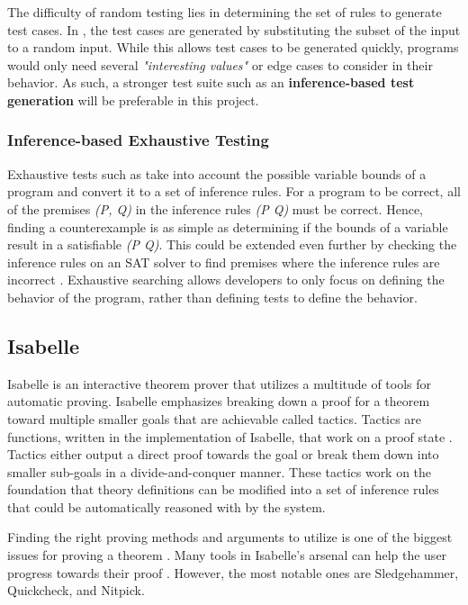 The difficulty of random testing lies in determining the set of rules to generate test cases. In \cite{differentialTesting}, the test cases 
are generated by substituting the subset of the input to a random input. While this allows test cases to be generated quickly, programs would only 
need several \emph{"interesting values"} or edge cases to consider in their behavior. As such, a stronger test suite such as an 
\textbf{inference-based test generation} will be preferable in this project.

\subsubsection{Inference-based Exhaustive Testing}
\label{sec:inferenceTesting}

Exhaustive tests such as \cite{isabelleQuickcheck} take into account the possible variable bounds of a program and convert it to a set of 
inference rules. For a program to be correct, all of the premises \emph{(P, Q)} in the inference rules \emph{(P \rightarrow Q)} must be correct. Hence, 
finding a counterexample is as simple as determining if the bounds of a variable result in a satisfiable \emph{\lnot(P \rightarrow Q)}. 
This could be extended even further by checking the inference rules on an SAT solver to find premises where the inference rules are incorrect 
\cite[Ch. 5]{isabelleProof}. Exhaustive searching allows developers to only focus on defining the behavior of the program, rather than defining 
tests to define the behavior.

\subsection{Isabelle}
\label{sec:Isabelle}

Isabelle is an interactive theorem prover that utilizes a multitude of tools for automatic proving. Isabelle emphasizes breaking down a proof 
for a theorem toward multiple smaller goals that are achievable called tactics. Tactics are functions, written in the implementation of Isabelle, 
that work on a proof state \cite{isabelleProof}. Tactics either output a direct proof towards the goal or break them down into smaller sub-goals 
in a divide-and-conquer manner. These tactics work on the foundation that theory definitions can be modified into a set of inference rules that 
could be automatically reasoned with by the system.

Finding the right proving methods and arguments to utilize is one of the biggest issues for proving a theorem \cite{isabelleProof}. 
Many tools in Isabelle's arsenal can help the user progress towards their proof \cite{IsabelleHOL}. However, the most notable ones are 
Sledgehammer, Quickcheck, and Nitpick.

